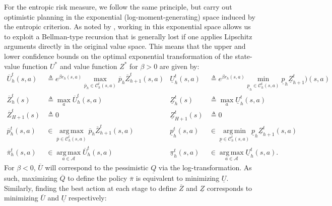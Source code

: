 \documentclass[final,12pt]{colt2026} %
\begin{document}
For the entropic risk measure, we follow the same principle, but carry out optimistic planning in the exponential (log-moment-generating) space induced by the entropic criterion. As noted by \citet{FeiYCW21}, working in this exponential space allows us to exploit a Bellman-type recursion that is generally lost if one applies Lipschitz arguments directly in the original value space. This means that the upper and lower confidence bounds on the optimal exponential transformation of the state-value function $U^*$ and value function $Z^*$ for $\beta > 0$ are given by: 
\begin{align*}
    \overline{U}_h^t(s, a) &\triangleq e^{\beta r_h(s,a)} \max_{\overline{p}_h \in \mathcal{C}_h^t(s,a)} \overline{p}_h \overline{Z}_{h+1}^t(s, a) & 
    \underline{U}_h^t(s, a) &\triangleq e^{\beta r_h(s,a)}\min_{\underline{p}_h \in \mathcal{C}_h^t(s,a)} \underline{p}_h \underline{Z}_{h+1}^t)(s, a) \\
    \overline{Z}_h^t(s) &\triangleq \max_{a} \overline{U}_h^t(s, a) & 
    \underline{Z}_h^t(s) &\triangleq \max_{a} \underline{U}_h^t(s, a) \\
    \overline{Z}_{H+1}^t(s) &\triangleq 0 & 
    \underline{Z}_{H+1}^t(s) &\triangleq 0 \\
    \overline{p}_h^t(s, a) &\in \operatorname*{arg\,max}_{\overline{p} \in \mathcal{C}_h^t(s,a)} \overline{p}_h \overline{Z}_{h+1}^t(s, a) & 
    \underline{p}_h^t(s, a) &\in \operatorname*{arg\,min}_{\underline{p} \in \mathcal{C}_h^t(s,a)} \underline{p}_h \underline{Z}_{h+1}^t(s, a) \\
    \overline{\pi}_h^t(s, a) &\in \operatorname*{arg\,max}_{a \in \mathcal{A}} \overline{U}_h^t(s, a) & 
    \underline{\pi}_h^t(s, a) &\in \operatorname*{arg\,max}_{a \in \mathcal{A}} \underline{U}_h^t(s, a).
\end{align*}
For $\beta < 0$, $ \overline{U}$ will correspond to the pessimistic $\underline{Q}$ via the log-transformation. As such, maximizing $\overline{Q}$ to define the policy $\overline{\pi}$ is equivalent to minimizing $\underline{U}$. Similarly, finding the best action at each stage to define $\overline{Z}$ and $\underline{Z}$ corresponds to minimizing $\overline{U}$ and $\underline{U}$ respectively:
\end{document}
